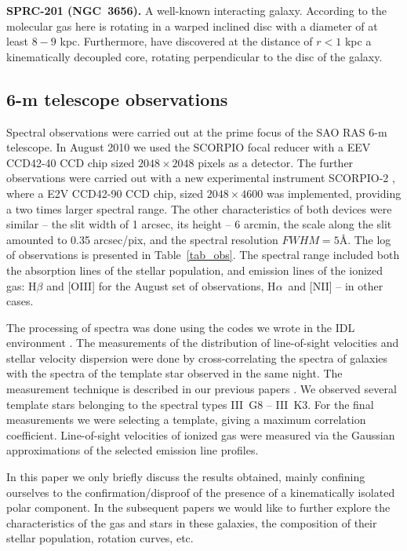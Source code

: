 \documentclass[useAMS,usenatbib]{mn2e}
\def\Ha{H$\alpha$}
\begin{document}
\textbf{SPRC-201 (NGC~3656).} A well-known interacting galaxy.
According to \citet{Young2002} the molecular gas here is rotating
in a warped inclined disc with a diameter of at least $8-9$ kpc.
Furthermore, \citet{Balcells1990} have discovered  at the distance
of $r<1$ kpc a kinematically decoupled core, rotating perpendicular
to the disc of the galaxy.


\subsection{6-m telescope observations}

Spectral observations were carried out at the prime focus of the SAO RAS
6-m telescope. In August 2010 we used the SCORPIO focal
reducer \citep{AfanasievMoiseev2005} with a EEV CCD42-40 CCD chip
sized $2048\times2048$ pixels as a detector. The further
observations were carried out with a new experimental instrument
SCORPIO-2 \citep{AfanasievMoiseev2011}, where a E2V CCD42-90 CCD chip, sized
$2048\times4600$ was implemented, providing a two times larger
spectral range. The other characteristics of both devices were
similar -- the slit width of 1 arcsec, its height -- 6 arcmin,
the scale along the slit amounted to 0.35 arcsec/pix, and the
spectral resolution $FWHM=5$\AA. The log of observations is
presented in Table~\ref{tab_obs}. The spectral range included both
the   absorption lines of the stellar population, and emission lines of the ionized gas: H$\beta$
and [OIII] for the August set  of observations, \Ha\, and [NII] -- in other cases.


The processing of spectra  was done using the codes we wrote in the
IDL environment \cite[see, e.g.,][]{Zasov2008}. The measurements
of the distribution of line-of-sight velocities and stellar velocity
dispersion  were done by cross-correlating the spectra of galaxies
with the spectra of the template star
observed in the same night. The measurement technique is described
in our previous papers \citep{Moiseev2001,Zasov2008}. We observed
several template stars belonging to the spectral types III~G8 --
III~K3. For the final measurements we were selecting a template,
giving a maximum correlation coefficient. Line-of-sight velocities of
ionized gas were measured via the Gaussian approximations of the
selected emission line profiles.

In this paper we only briefly discuss the results obtained, mainly
confining ourselves to the confirmation/disproof of the presence
of a kinematically isolated polar component. In the subsequent
papers we would like to further explore the characteristics of the
gas and stars in these galaxies, the composition of their stellar
population, rotation curves, etc.
\end{document}
